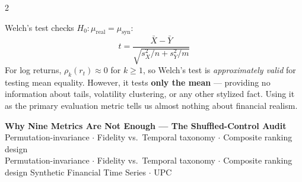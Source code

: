 \documentclass[10pt]{article}
\newcommand{\navybox}[2]{\begin{tcolorbox}[mybox={Navy}{LBg},title={#1}]#2\end{tcolorbox}}
\newcommand{\pagehead}[2]{%
  \begin{tcolorbox}[enhanced,arc=0pt,outer arc=0pt,boxrule=0pt,
    colback=Navy,colframe=Navy,
    top=5pt,bottom=5pt,left=8pt,right=8pt,
    before skip=0pt,after skip=10pt]
  {\color{white}\large\bfseries #1}%
  \ifx\relax#2\relax\else\\[1pt]{\color{blue!30!white}\small #2}\fi
  \hfill{\color{blue!20!white}\footnotesize Synthetic Financial Time Series $\cdot$ UPC}
  \end{tcolorbox}}
\begin{document}
\begin{multicols}{2}
\navybox{Welch's $t$-test: A Narrower Failure}{%
Welch's test checks $H_0: \mu_\text{real} = \mu_\text{syn}$:
\begin{equation*}
  t = \frac{\bar{X} - \bar{Y}}{\sqrt{s^2_X/n + s^2_Y/m}}
\end{equation*}
For log returns, $\rho_k(r_t) \approx 0$ for $k \geq 1$, so Welch's test is \emph{approximately valid} for testing mean equality. However, it tests \textbf{only the mean} --- providing no information about tails, volatility clustering, or any other stylized fact. Using it as the primary evaluation metric tells us almost nothing about financial realism.}

\end{multicols}

\clearpage

\pagehead{Why Nine Metrics Are Not Enough --- The Shuffled-Control Audit}
         {Permutation-invariance $\cdot$ Fidelity vs.\ Temporal taxonomy $\cdot$ Composite ranking design}
\end{document}
